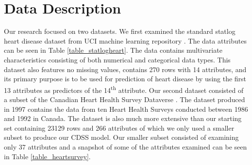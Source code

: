 \documentclass[conference]{IEEEtran}
\begin{document}
\section{Data Description}
Our research focused on two datasets. We first examined the standard statlog heart disease dataset from UCI machine learning repository \cite{StatlogHeart}.  The data attributes can be seen in Table \ref{table_statlogheart}.  The data contains multivariate characteristics consisting of both numerical and categorical data types.
This dataset also features no missing values, contains 270 rows with 14 attributes, and its primary purpose is to be used for prediction of heart disease by using the first 13 attributes as predictors of the 14\textsuperscript{th} attribute.
Our second dataset consisted of a subset of the Canadian Heart Health Survey Dataverse \cite{HealthSurvey}. The dataset produced in 1997 contains the data from ten Heart Health Surveys conducted between 1986 and 1992 in Canada. The dataset is also much more extensive than our starting set containing 23129 rows and 266 attributes of which we only used a smaller subset to produce our CDSS model.
Our smaller subset consisted of examining only 37 attributes and a snapshot of some of the attributes examined can be seen in Table \ref{table_heartsurvey}.
\end{document}
